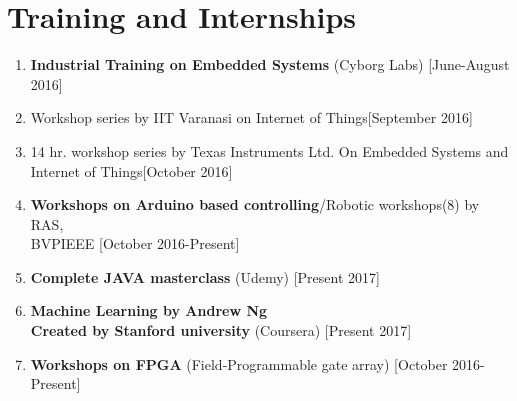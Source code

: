 \documentclass[11pt]{article}
\begin{document}
\begin{minipage}{1.0\linewidth}
\section{\color{magenta}Tra\color{black}ining and Internships}
\begin{enumerate}
\item \textbf{Industrial Training on Embedded Systems} (Cyborg Labs) [June-August 2016]
\item {Workshop series by IIT Varanasi on Internet of Things}[September 2016]
\item 14 hr. workshop series by Texas Instruments Ltd. On Embedded Systems and\\ Internet of Things[October 2016]
\item \textbf{Workshops on Arduino based controlling}/Robotic workshops(8) by RAS,\\ BVPIEEE [October 2016-Present]
\item \textbf{Complete JAVA masterclass} (Udemy) [Present 2017]
\item \textbf{Machine Learning by Andrew Ng\\ Created by Stanford university} (Coursera) [Present 2017]
\item \textbf{Workshops on FPGA} (Field-Programmable gate array) [October 2016-Present]

\end{enumerate}
\end{minipage}
\end{document}
